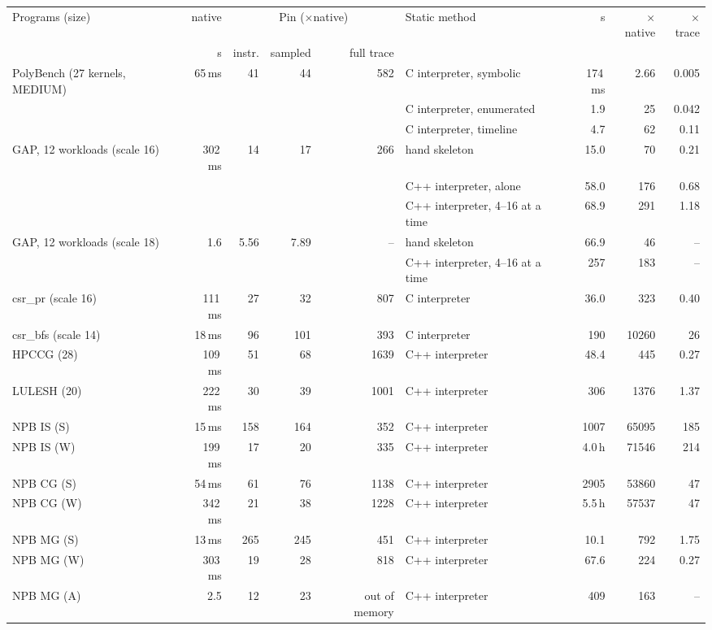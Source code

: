 \begin{tabular}{lrrrrlrrr}
\toprule
Programs (size) & native & \multicolumn{3}{c}{Pin ($\times$native)} & Static method & s & $\times$native & $\times$trace \\
\cmidrule(lr){3-5}\cmidrule(lr){7-9}
 & s & instr. & sampled & full trace & & & & \\
\midrule
PolyBench (27 kernels, MEDIUM) & 65\,ms & 41 & 44 & 582 & C interpreter, symbolic & 174\,ms & 2.66 & 0.005 \\
 & & & & & C interpreter, enumerated & 1.9 & 25 & 0.042 \\
 & & & & & C interpreter, timeline & 4.7 & 62 & 0.11 \\
GAP, 12 workloads (scale 16) & 302\,ms & 14 & 17 & 266 & hand skeleton & 15.0 & 70 & 0.21 \\
 & & & & & C++ interpreter, alone & 58.0 & 176 & 0.68 \\
 & & & & & C++ interpreter, 4--16 at a time & 68.9 & 291 & 1.18 \\
GAP, 12 workloads (scale 18) & 1.6 & 5.56 & 7.89 & -- & hand skeleton & 66.9 & 46 & -- \\
 & & & & & C++ interpreter, 4--16 at a time & 257 & 183 & -- \\
csr\_pr (scale 16) & 111\,ms & 27 & 32 & 807 & C interpreter & 36.0 & 323 & 0.40 \\
csr\_bfs (scale 14) & 18\,ms & 96 & 101 & 393 & C interpreter & 190 & 10260 & 26 \\
HPCCG (28) & 109\,ms & 51 & 68 & 1639 & C++ interpreter & 48.4 & 445 & 0.27 \\
LULESH (20) & 222\,ms & 30 & 39 & 1001 & C++ interpreter & 306 & 1376 & 1.37 \\
NPB IS (S) & 15\,ms & 158 & 164 & 352 & C++ interpreter & 1007 & 65095 & 185 \\
NPB IS (W) & 199\,ms & 17 & 20 & 335 & C++ interpreter & 4.0\,h & 71546 & 214 \\
NPB CG (S) & 54\,ms & 61 & 76 & 1138 & C++ interpreter & 2905 & 53860 & 47 \\
NPB CG (W) & 342\,ms & 21 & 38 & 1228 & C++ interpreter & 5.5\,h & 57537 & 47 \\
NPB MG (S) & 13\,ms & 265 & 245 & 451 & C++ interpreter & 10.1 & 792 & 1.75 \\
NPB MG (W) & 303\,ms & 19 & 28 & 818 & C++ interpreter & 67.6 & 224 & 0.27 \\
NPB MG (A) & 2.5 & 12 & 23 & out of memory & C++ interpreter & 409 & 163 & -- \\
\bottomrule
\end{tabular}
